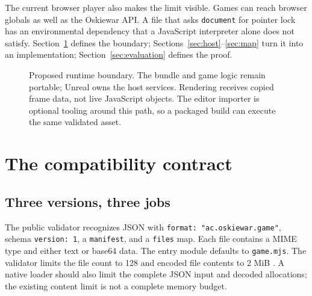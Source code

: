 \documentclass[10pt,letterpaper,twocolumn]{article}
\newcommand{\code}[1]{\texttt{\nolinkurl{#1}}}
\begin{document}
The current browser player also makes the limit visible. Games can reach browser globals as well as the Oskiewar API. A file that asks \code{document} for pointer lock has an environmental dependency that a JavaScript interpreter alone does not satisfy. Section~\ref{sec:contract} defines the boundary; Sections~\ref{sec:host}--\ref{sec:map} turn it into an implementation; Section~\ref{sec:evaluation} defines the proof.

\begin{figure}[t]
\centering
{}
\caption{Proposed runtime boundary. The bundle and game logic remain portable; Unreal owns the host services. Rendering receives copied frame data, not live JavaScript objects. The editor importer is optional tooling around this path, so a packaged build can execute the same validated asset.}
\label{fig:boundary}
\end{figure}

\section{The compatibility contract}\label{sec:contract}
\subsection{Three versions, three jobs}
The public validator recognizes JSON with \code{format: "ac.oskiewar.game"}, schema \code{version: 1}, a \code{manifest}, and a \code{files} map. Each file contains a MIME type and either text or base64 data. The entry module defaults to \code{game.mjs}. The validator limits the file count to 128 and encoded file contents to 2 MiB \citep{bundle}. A native loader should also limit the complete JSON input and decoded allocations; the existing content limit is not a complete memory budget.
\end{document}

